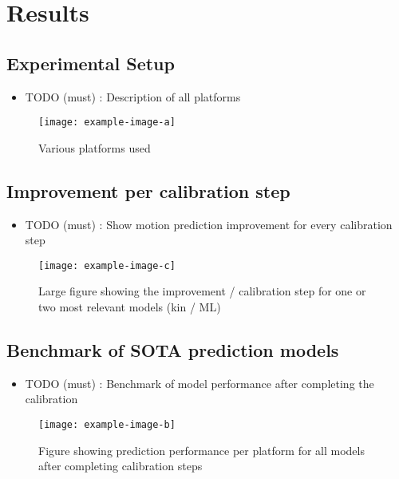 \section{Results}

\lightlipsum[1]

\subsection{Experimental Setup}

\begin{itemize}
	\item TODO (must) : Description of all platforms
\end{itemize}

\lightlipsum[1]

\begin{figure}[htbp]
	\centering
	\texttt{[image: example-image-a]}
	\caption{Various platforms used}
	\label{fig:test_platforms}
\end{figure}

\subsection{Improvement per calibration step}
\begin{itemize}
	\item TODO (must) : Show motion prediction improvement for every calibration step
\end{itemize}

\lightlipsum[1-3]

\begin{figure*}[htb]
	\centering
	\texttt{[image: example-image-c]}
	\caption{Large figure showing the improvement / calibration step for one or two most relevant models (kin / ML)}
	\label{fig:prediction_improvement_step}
\end{figure*}

\subsection{Benchmark of SOTA prediction models}

\begin{itemize}
	\item TODO (must) : Benchmark of model performance after completing the calibration
\end{itemize}

\lightlipsum[1-4]

\begin{figure*}[htp]
	\centering
	\texttt{[image: example-image-b]}
	\caption{Figure showing prediction performance per platform for all models after completing calibration steps}
	\label{fig:prediction_benchmark}
\end{figure*}






